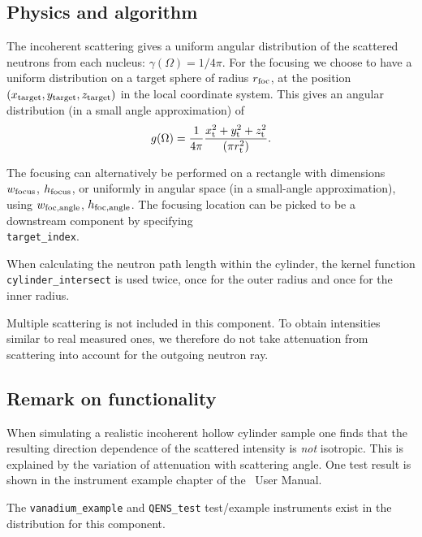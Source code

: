 \subsection{Physics and algorithm}

The incoherent scattering gives
a uniform angular distribution of the scattered
neutrons from each nucleus: $\gamma(\Omega) = 1/4\pi$.
For the focusing we choose to have a uniform distribution on
a target sphere of radius $r_{\rm foc}$, at the position
$(x_{\rm target},y_{\rm target},z_{\rm target})$
in the local coordinate system.
This gives an angular distribution (in a small angle approximation)
of
\begin{equation}
g(\Omega) = \frac{1}{4\pi}
  \frac{x_{\rm t}^2+y_{\rm t}^2+z_{\rm t}^2}{(\pi r_{\rm t}^2)}.
\end{equation}

The focusing can alternatively be performed on a rectangle with dimensions
$w_{\rm focus}$, $h_{\rm focus}$, or uniformly in angular space
(in a small-angle approximation),
using $w_{\rm foc, angle}$, $h_{\rm foc, angle}$.
The focusing location can be picked to be a downstream component by
specifying \\
\verb+target_index+.

When calculating the neutron path length within
the cylinder, the kernel function \\
\verb+cylinder_intersect+
is used twice, once for the outer radius and once
for the inner radius.

Multiple scattering is not included in this component. To obtain
intensities similar to real measured ones, we therefore do not
take attenuation from scattering into account for the outgoing
neutron ray.

\subsection{Remark on functionality}
When simulating a realistic incoherent hollow cylinder sample
one finds that  the resulting direction dependence
of the scattered intensity is {\em not} isotropic.
This is explained by the variation of attenuation with
scattering angle.
One test result is shown in the instrument example chapter of the \MCS\ User Manual.

The \verb+vanadium_example+ and \verb+QENS_test+ test/example instruments exist in the distribution for this component.
